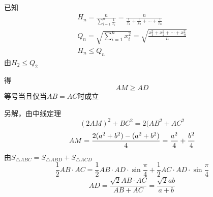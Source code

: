 \documentclass[UTF8]{article}
\begin{document}
已知
$$
\begin{array}{c} 
  H_{n}=\frac{n}{\sum \limits_{i=1}^{n}\frac{1}{x_{i}}}= \frac{n}{\frac{1}{x_{1}}+ \frac{1}{x_{2}}+ \cdots + \frac{1}{x_{n}}} \\ Q_{n}=\sqrt{\sum \limits_{i=1}^{n}x_{i}^{2}}= \sqrt{\frac{x_{1}^{2}+ x_{2}^{2}+ \cdots + x_{n}^{2}}{n}} \\ H_{n}\leq Q_{n} 
\end{array}
$$
由$H_2\le Q_2$

得
$$
AM\ge AD
$$
等号当且仅当$AB=AC$时成立

另解，由中线定理
$$
{\left( {2AM} \right)^2} + B{C^2} = 2(A{B^2} + A{C^2}$$
$$AM = \frac{{2({a^2} + {b^2}) - ({a^2} + {b^2})}}{4} = \frac{{{a^2}}}{4} + \frac{{{b^2}}}{4}\\
$$
由$S_{\triangle ABC}=S_{\triangle ABD}+S_{\triangle ACD}$
$$
\frac{1}{2}AB \cdot AC = \frac{1}{2}AB \cdot AD \cdot \sin \frac{\pi }{4} + \frac{1}{2}AC \cdot AD \cdot \sin \frac{\pi }{4}$$
$$
AD = \frac{{\sqrt 2 AB \cdot AC}}{{AB + AC}} = \frac{{\sqrt 2 ab}}{{a + b}}
$$



\end{document}
